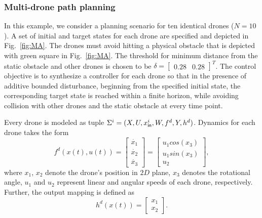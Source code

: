 \subsubsection{Multi-drone path planning}\label{sec:Multirobot}
In this example, we consider a planning scenario for ten identical drones ($N=10$). A set of initial and target states for each drone are specified and depicted in Fig.~\ref{fig:MA}. The drones must avoid hitting a physical obstacle that is depicted with green square in Fig.~\ref{fig:MA}. %
The threshold for minimum distance from the static obstacle and other drones is chosen to be $\delta=\begin{bmatrix}0.28&0.28\end{bmatrix}^T$. %
The control objective is to synthesize a controller for each drone so that in the presence of additive bounded disturbance, beginning from the specified initial state, the corresponding target state is reached within a finite horizon, while avoiding collision with other drones and the static obstacle at every time point. 

Every drone is modeled as tuple $\Sigma^i=(X,U,x_{\mathsf{in}}^i,W,f^d,Y,h^d)$. %
Dynamics for each drone takes the form
\begin{equation*}\label{eq:unicycle_ss}
	f^{d}(x(t),u(t))=
	\begin{bmatrix}
		\dot{x_1}\\
		\dot{x_2}\\
		\dot{x_3}
	\end{bmatrix}=
	\begin{bmatrix}
		u_1cos(x_3)\\
		u_1sin(x_3)\\
		u_2
	\end{bmatrix},
\end{equation*}
where $x_1$, $x_2$ denote the drone's position in $2D$ plane, $x_3$ denotes the rotational angle, $u_1$ and $u_2$ represent linear and angular speeds of each drone, respectively. Further, the output mapping is defined as
\[
h^d(x(t))=\begin{bmatrix}
	x_1\\x_2
\end{bmatrix}.
\]



